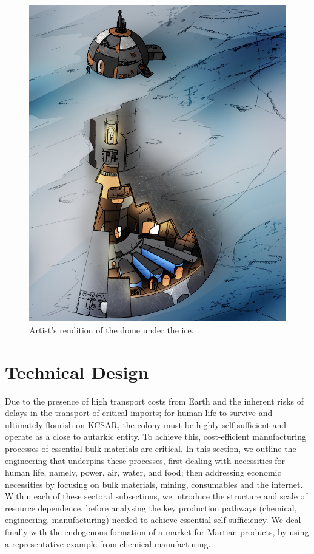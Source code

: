 \documentclass[fleqn,10pt]{Stylesheet} %
\begin{document}
\begin{figure}
    \centering
    \includegraphics[width=\linewidth]{art/dome_crop.jpg}
    \caption{Artist's rendition of the dome under the ice.}
    \label{fig:dome}
\end{figure}


\section{Technical Design}
\label{sec:technical-design}

Due to the presence of high transport costs from Earth and the inherent risks of delays in the transport of critical imports; for human life to survive and ultimately flourish on KCSAR, the colony must be highly self-sufficient and operate as a close to autarkic entity. To achieve this, cost-efficient manufacturing processes of essential bulk materials are critical. In this section, we outline the engineering that underpins these processes, first dealing with necessities for human life, namely, power, air, water, and food; then addressing economic necessities by focusing on bulk materials, mining, consumables and the internet. Within each of these sectoral subsections, we introduce the structure and scale of resource dependence, before analysing the key production pathways (chemical, engineering, manufacturing) needed to achieve essential self sufficiency. We deal finally with the endogenous formation of a market for Martian products, by using a representative example from chemical manufacturing.
\end{document}
